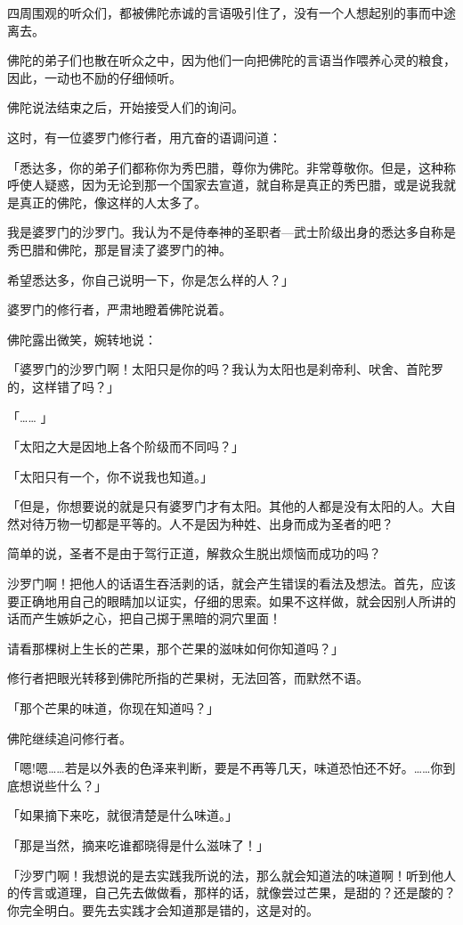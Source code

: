 \documentclass[twoside,openany]{book}
\begin{document}
四周围观的听众们，都被佛陀赤诚的言语吸引住了，没有一个人想起别的事而中途离去。

佛陀的弟子们也散在听众之中，因为他们一向把佛陀的言语当作喂养心灵的粮食，因此，一动也不励的仔细倾听。

佛陀说法结束之后，开始接受人们的询问。

这时，有一位婆罗门修行者，用亢奋的语调问道：

「悉达多，你的弟子们都称你为秀巴腊，尊你为佛陀。非常尊敬你。但是，这种称呼使人疑惑，因为无论到那一个国家去宣道，就自称是真正的秀巴腊，或是说我就是真正的佛陀，像这样的人太多了。

我是婆罗门的沙罗门。我认为不是侍奉神的圣职者---武士阶级出身的悉达多自称是秀巴腊和佛陀，那是冒渎了婆罗门的神。

希望悉达多，你自己说明一下，你是怎么样的人？」

婆罗门的修行者，严肃地瞪着佛陀说着。

佛陀露出微笑，婉转地说：

「婆罗门的沙罗门啊！太阳只是你的吗？我认为太阳也是刹帝利、吠舍、首陀罗的，这样错了吗？」

「……	」

「太阳之大是因地上各个阶级而不同吗？」

「太阳只有一个，你不说我也知道。」

「但是，你想要说的就是只有婆罗门才有太阳。其他的人都是没有太阳的人。大自然对待万物一切都是平等的。人不是因为种姓、出身而成为圣者的吧？

简单的说，圣者不是由于驾行正道，解救众生脱出烦恼而成功的吗？

沙罗门啊！把他人的话语生吞活剥的话，就会产生错误的看法及想法。首先，应该要正确地用自己的眼睛加以证实，仔细的思索。如果不这样做，就会因别人所讲的话而产生嫉妒之心，把自己掷于黑暗的洞穴里面！

请看那棵树上生长的芒果，那个芒果的滋味如何你知道吗？」

修行者把眼光转移到佛陀所指的芒果树，无法回答，而默然不语。

「那个芒果的味道，你现在知道吗？」

佛陀继续追问修行者。

「嗯!嗯……若是以外表的色泽来判断，要是不再等几天，味道恐怕还不好。……你到底想说些什么？」

「如果摘下来吃，就很清楚是什么味道。」

「那是当然，摘来吃谁都晓得是什么滋味了！」

「沙罗门啊！我想说的是去实践我所说的法，那么就会知道法的味道啊！听到他人的传言或道理，自己先去做做看，那样的话，就像尝过芒果，是甜的？还是酸的？你完全明白。要先去实践才会知道那是错的，这是对的。
\end{document}
